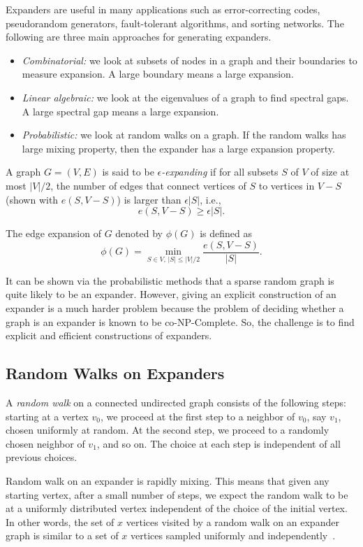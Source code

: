 \documentclass[11pt]{article}
\theoremstyle{plain}
\begin{document}
Expanders are useful in many applications such as error-correcting
codes, pseudorandom generators, fault-tolerant algorithms, and sorting
networks. The following are three main approaches for generating expanders.
\begin{itemize}
	\item \emph{Combinatorial:} we look at subsets of nodes in a graph and their
	boundaries to measure expansion. A large boundary means a large expansion.
	\item \emph{Linear algebraic:} we look at the eigenvalues of a graph to
	find spectral gaps. A large spectral gap means a large expansion.
	\item \emph{Probabilistic:} we look at random walks on a graph. If the random
	walks has large mixing property, then the expander has a large expansion
	property.
\end{itemize}
A graph $G=(V,E)$ is said to be $\epsilon$\emph{-expanding }if for
all subsets $S$ of $V$ of size at most $|V|/2$, the number of edges
that connect vertices of $S$ to vertices in $V-S$ (shown with $e(S,V-S)$)
is larger than $\epsilon|S|$, i.e.,
\[
e(S,V-S)\geq\epsilon|S|.
\]

The edge expansion of $G$ denoted by $\phi(G)$ is defined as
\[
\phi(G)=\min_{S\in V,\,|S|\leq|V|/2}\frac{e(S,V-S)}{|S|}.
\]

It can be shown via the probabilistic methods that a sparse random
graph is quite likely to be an expander. However, giving an explicit
construction of an expander is a much harder problem because the problem
of deciding whether a graph is an expander is known to be co-NP-Complete.
So, the challenge is to find explicit and efficient constructions
of expanders. %


\subsection{Random Walks on Expanders}

A \emph{random walk} on a connected undirected graph consists of the
following steps: starting at a vertex $v_{0}$, we proceed at the
first step to a neighbor of $v_{0}$, say $v_{1}$, chosen uniformly
at random. At the second step, we proceed to a randomly chosen neighbor
of $v_{1}$, and so on. The choice at each step is independent of
all previous choices.

Random walk on an expander is rapidly mixing. This means that given
any starting vertex, after a small number of steps, we expect the
random walk to be at a uniformly distributed vertex independent of
the choice of the initial vertex. In other words, the set of $x$
vertices visited by a random walk on an expander graph is similar
to a set of $x$ vertices sampled uniformly and independently~\cite{Hoory:2006:Expanders}.
\end{document}
